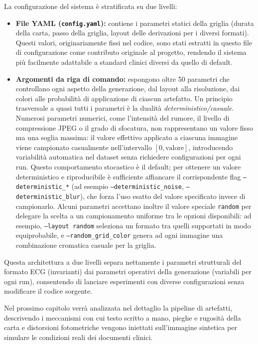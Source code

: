 La configurazione del sistema è stratificata su due livelli:

\begin{itemize}
    \item \textbf{File YAML (\texttt{config.yaml}):} contiene i parametri statici della griglia (durata della carta, passo della griglia, layout delle derivazioni per i diversi formati). Questi valori, originariamente fissi nel codice, sono stati estratti in questo file di configurazione come contributo originale al progetto, rendendo il sistema più facilmente adattabile a standard clinici diversi da quello di default.
    \item \textbf{Argomenti da riga di comando:} espongono oltre 50 parametri che controllano ogni aspetto della generazione, dal layout alla risoluzione, dai colori alle probabilità di applicazione di ciascun artefatto. Un principio trasversale a quasi tutti i parametri è la dualità \textit{deterministico/casuale}. Numerosi parametri numerici, come l'intensità del rumore, il livello di compressione JPEG o il grado di sfocatura, non rappresentano un valore fisso ma una soglia massima: il valore effettivo applicato a ciascuna immagine viene campionato casualmente nell'intervallo $[0, \text{valore}]$, introducendo variabilità automatica nel dataset senza richiedere configurazioni per ogni run. Questo comportamento stocastico è il default; per ottenere un valore deterministico e riproducibile è sufficiente affiancare il corrispondente flag \texttt{--deterministic\_*} (ad esempio \texttt{--deterministic\_noise}, \texttt{--deterministic\_blur}), che forza l'uso esatto del valore specificato invece di campionarlo. Alcuni parametri accettano inoltre il valore speciale \texttt{random} per delegare la scelta a un campionamento uniforme tra le opzioni disponibili: ad esempio, \texttt{--layout random} seleziona un formato tra quelli supportati in modo equiprobabile, e \texttt{--random\_grid\_color} genera ad ogni immagine una combinazione cromatica casuale per la griglia.
\end{itemize}

Questa architettura a due livelli separa nettamente i parametri strutturali del formato ECG (invarianti) dai parametri operativi della generazione (variabili per ogni run), consentendo di lanciare esperimenti con diverse configurazioni senza modificare il codice sorgente.

\vspace{4mm}
Nel prossimo capitolo verrà analizzata nel dettaglio la pipeline di artefatti, descrivendo i meccanismi con cui testo scritto a mano, pieghe e rugosità della carta e distorsioni fotometriche vengono iniettati sull'immagine sintetica per simulare le condizioni reali dei documenti clinici.
